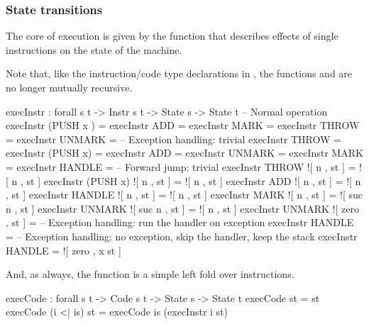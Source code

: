 \subsubsection{State transitions}
\label{sec:lin-instr-semantics}

The core of execution is given by the function  that describes
effects of single instructions on the state of the machine.

Note that, like the instruction/code type declarations in ,
the functions  and  are no longer mutually
recursive.

\begin{codei}
  execInstr : forall {s t} -> Instr s t -> State s -> State t
  -- Normal operation
  execInstr (PUSH  x ) \tick[         	st ] = \tick[ x \scons st ]
  execInstr  ADD        = \tick[ (x + y) \scons st ]
  execInstr  MARK      \tick[          	st ] = 
  execInstr  THROW     \tick[          	st ] = 
  execInstr  UNMARK     = \tick[ x \scons st ]
  -- Exception handling: trivial
  execInstr  THROW		\x[     n , st ] = \x[     n , st ]
  execInstr (PUSH x)	\x[     n , st ] = \x[     n , st ]
  execInstr  ADD		\x[     n , st ] = \x[     n , st ]
  execInstr  UNMARK		\x[     n , st ] = \x[     n , st ]
  execInstr  MARK		\x[     n , st ] = \x[ suc n , st ]
  execInstr  HANDLE		\x[ suc n , st ] = \x[     n , st ]
  -- Forward jump: trivial
  execInstr  THROW		![ n , st ] = ![ n , st ]
  execInstr (PUSH x)	![ n , st ] = ![ n , st ]
  execInstr  ADD		![ n , st ] = ![ n , st ]
  execInstr  HANDLE		![ n , st ] = ![ n , st ]
  execInstr  MARK		![     n , st ] = ![ suc n , st ]
  execInstr  UNMARK		![ suc n , st ] = ![     n , st ]
  execInstr  UNMARK		![ zero  , st ] = \tick[ st ]
  -- Exception handling: run the handler on exception
  execInstr  HANDLE		\x[ zero , st ] = \tick[ st ]
  -- Exception handling: no exception, skip the handler, keep the stack
  execInstr  HANDLE		 = ![ zero , x \scons st ]
\end{codei}

\noindent And, as always, the function  is a simple left fold over
instructions.

\begin{code}
    execCode : forall {s t} -> Code s t -> State s -> State t
    execCode \nil st = st
    execCode (i <| is) st = execCode is (execInstr i st)
\end{code}

